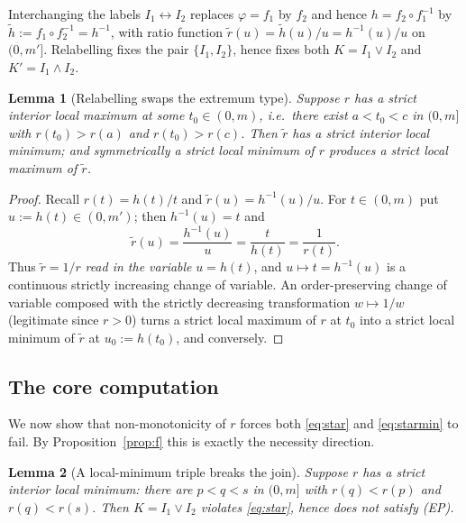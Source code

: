 \documentclass{amsart}
\theoremstyle{plain}
\newtheorem{lemma}{Lemma}
\theoremstyle{definition}
\begin{document}
Interchanging the labels $I_1\leftrightarrow I_2$ replaces $\varphi=f_1$ by $f_2$ and hence
$h=f_2\circ f_1^{-1}$ by $\tilde h:=f_1\circ f_2^{-1}=h^{-1}$, with ratio function
$\tilde r(u)=\tilde h(u)/u=h^{-1}(u)/u$ on $(0,m']$.  Relabelling fixes the pair
$\{I_1,I_2\}$, hence fixes both $K=I_1\vee I_2$ and $K'=I_1\wedge I_2$.

\begin{lemma}[Relabelling swaps the extremum type]\label{lem:relabel}
Suppose $r$ has a strict interior \emph{local maximum} at some $t_0\in(0,m)$, i.e.\ there
exist $a<t_0<c$ in $(0,m]$ with $r(t_0)>r(a)$ and $r(t_0)>r(c)$.  Then $\tilde r$ has a
strict interior local \emph{minimum}; and symmetrically a strict local minimum of $r$
produces a strict local maximum of $\tilde r$.
\end{lemma}

\begin{proof}
Recall $r(t)=h(t)/t$ and $\tilde r(u)=h^{-1}(u)/u$.  For $t\in(0,m)$ put $u:=h(t)\in
(0,m')$; then $h^{-1}(u)=t$ and
\[
\tilde r(u)=\frac{h^{-1}(u)}{u}=\frac{t}{h(t)}=\frac1{r(t)} .
\]
Thus $\tilde r=1/r$ \emph{read in the variable} $u=h(t)$, and $u\mapsto t=h^{-1}(u)$ is a
continuous strictly increasing change of variable.  An order-preserving change of variable
composed with the strictly decreasing transformation $w\mapsto 1/w$ (legitimate since $r>0$)
turns a strict local maximum of $r$ at $t_0$ into a strict local minimum of $\tilde r$ at
$u_0:=h(t_0)$, and conversely.
\end{proof}

\subsection{The core computation}

We now show that non-monotonicity of $r$ forces both \eqref{eq:star} and \eqref{eq:starmin}
to fail.  By Proposition~\ref{prop:f} this is exactly the necessity direction.

\begin{lemma}[A local-minimum triple breaks the join]\label{lem:joinbreak}
Suppose $r$ has a strict interior local minimum: there are $p<q<s$ in $(0,m]$ with
$r(q)<r(p)$ and $r(q)<r(s)$.  Then $K=I_1\vee I_2$ violates \eqref{eq:star}, hence does not
satisfy \textup{(EP)}.
\end{lemma}
\end{document}
